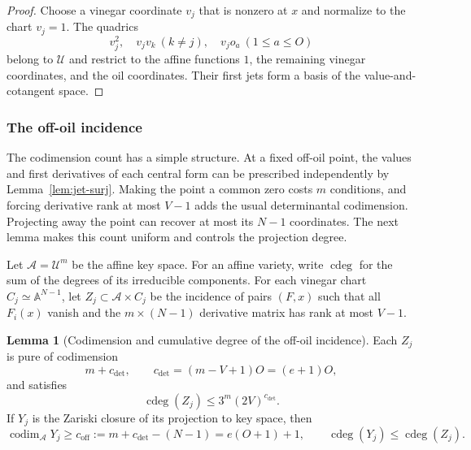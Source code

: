 \documentclass[11pt,a4paper]{article}
\theoremstyle{definition}
\newtheorem{lemma}[theorem]{Lemma}
\theoremstyle{remark}
\newcommand{\cU}{\mathcal U}
\newcommand{\codim}{\operatorname{codim}}
\newcommand{\cdeg}{\operatorname{cdeg}}
\newcommand{\off}{\mathrm{off}}
\begin{document}
\begin{proof}
Choose a vinegar coordinate $v_j$ that is nonzero at $x$ and normalize to the chart $v_j=1$.  The quadrics
\[
v_j^2,\quad v_jv_k\ (k\ne j),\quad v_jo_a\ (1\le a\le O)
\]
belong to $\cU$ and restrict to the affine functions $1$, the remaining vinegar coordinates, and the oil coordinates.  Their first jets form a basis of the value-and-cotangent space.
\end{proof}

\subsubsection{The off-oil incidence}

The codimension count has a simple structure.  At a fixed off-oil point, the values and first derivatives of each central form can be prescribed independently by Lemma~\ref{lem:jet-surj}.  Making the point a common zero costs $m$ conditions, and forcing derivative rank at most $V-1$ adds the usual determinantal codimension.  Projecting away the point can recover at most its $N-1$ coordinates.  The next lemma makes this count uniform and controls the projection degree.

Let $\mathcal A=\cU^m$ be the affine key space.  For an affine variety, write $\cdeg$ for the sum of the degrees of its irreducible components.  For each vinegar chart $C_j\simeq\mathbb A^{N-1}$, let $Z_j\subset\mathcal A\times C_j$ be the incidence of pairs $(F,x)$ such that all $F_i(x)$ vanish and the $m\times(N-1)$ derivative matrix has rank at most $V-1$.

\begin{lemma}[Codimension and cumulative degree of the off-oil incidence]\label{lem:off-incidence}
Each $Z_j$ is pure of codimension
\[
m+c_{\det},\qquad c_{\det}=(m-V+1)O=(e+1)O,
\]
and satisfies
\[
\cdeg(Z_j)\le 3^m(2V)^{c_{\det}}.
\]
If $Y_j$ is the Zariski closure of its projection to key space, then
\[
\codim_{\mathcal A}Y_j\ge c_{\off}:=m+c_{\det}-(N-1)=e(O+1)+1,
\qquad
\cdeg(Y_j)\le\cdeg(Z_j).
\]
\end{lemma}
\end{document}
